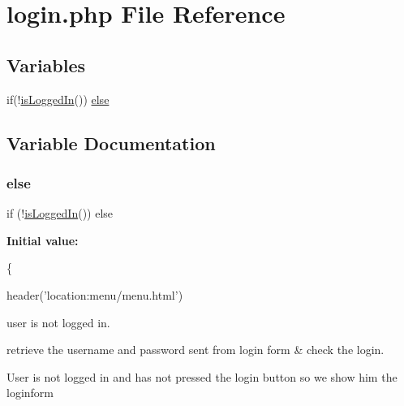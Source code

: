 \hypertarget{login_8php}{}\section{login.\+php File Reference}
\label{login_8php}
\subsection*{Variables}
\begin{DoxyCompactItemize}
\item 
if(!\hyperlink{login_8functions_8inc_8php_a33bdd79e5da367ebddd4cfbdbbfc7cff}{is\+Logged\+In}()) \hyperlink{login_8php_a1010d7ab496a5e27e59bdacbd20607d6}{else}
\end{DoxyCompactItemize}


\subsection{Variable Documentation}
\mbox{\label{login_8php_a1010d7ab496a5e27e59bdacbd20607d6}} 
\subsubsection{\texorpdfstring{else}{else}}
{\footnotesize\ttfamily if (!\hyperlink{login_8functions_8inc_8php_a33bdd79e5da367ebddd4cfbdbbfc7cff}{is\+Logged\+In}()) else}

{\bfseries Initial value\+:}
\begin{DoxyCode}
\{
        
        header(\textcolor{stringliteral}{'location:menu/menu.html'})
\end{DoxyCode}
user is not logged in.

retrieve the username and password sent from login form \& check the login.

User is not logged in and has not pressed the login button so we show him the loginform 